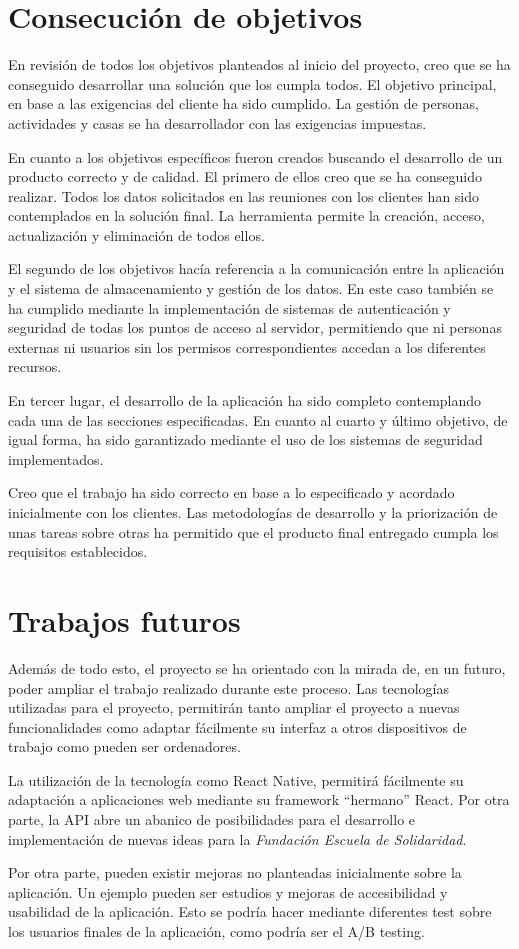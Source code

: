 \section{Consecución de objetivos}

En revisión de todos los objetivos planteados al inicio del proyecto, creo que se ha conseguido desarrollar una solución que los cumpla todos. El objetivo principal, en base a las exigencias del cliente ha sido cumplido. La gestión de personas, actividades y casas se ha desarrollador con las exigencias impuestas.

En cuanto a los objetivos específicos fueron creados buscando el desarrollo de un producto correcto y de calidad. El primero de ellos creo que se ha conseguido realizar. Todos los datos solicitados en las reuniones con los clientes han sido contemplados en la solución final. La herramienta permite la creación, acceso, actualización y eliminación de todos ellos.

El segundo de los objetivos hacía referencia a la comunicación entre la aplicación y el sistema de almacenamiento y gestión de los datos. En este caso también se ha cumplido mediante la implementación de sistemas de autenticación y seguridad de todas los puntos de acceso al servidor, permitiendo que ni personas externas ni usuarios sin los permisos correspondientes accedan a los diferentes recursos.

En tercer lugar, el desarrollo de la aplicación ha sido completo contemplando cada una de las secciones especificadas. En cuanto al cuarto y último objetivo, de igual forma, ha sido garantizado mediante el uso de los sistemas de seguridad implementados.

Creo que el trabajo ha sido correcto en base a lo especificado y acordado inicialmente con los clientes. Las metodologías de desarrollo y la priorización de unas tareas sobre otras ha permitido que el producto final entregado cumpla los requisitos establecidos.

\section{Trabajos futuros}

Además de todo esto, el proyecto se ha orientado con la mirada de, en un futuro, poder ampliar el trabajo realizado durante este proceso. Las tecnologías utilizadas para el proyecto, permitirán tanto ampliar el proyecto a nuevas funcionalidades como adaptar fácilmente su interfaz a otros dispositivos de trabajo como pueden ser ordenadores.

La utilización de la tecnología como React Native, permitirá fácilmente su adaptación a aplicaciones web mediante su framework ``hermano'' React. Por otra parte, la API abre un abanico de posibilidades para el desarrollo e implementación de nuevas ideas para la \textit{Fundación Escuela de Solidaridad}.

Por otra parte, pueden existir mejoras no planteadas inicialmente sobre la aplicación. Un ejemplo pueden ser estudios y mejoras de accesibilidad y usabilidad de la aplicación. Esto se podría hacer mediante diferentes test sobre los usuarios finales de la aplicación, como podría ser el A/B testing.